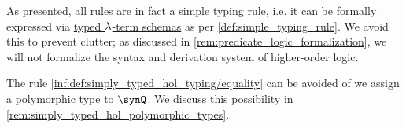 \begin{comments}
  \item As presented, all rules are in fact a simple typing rule, i.e. it can be formally expressed via \hyperref[def:lambda_term_schema]{typed \( {\mathrm \lambda} \)-term schemas} as per \cref{def:simple_typing_rule}. We avoid this to prevent clutter; as discussed in \cref{rem:predicate_logic_formalization}, we will not formalize the syntax and derivation system of higher-order logic.

  \item The rule \ref{inf:def:simply_typed_hol_typing/equality} can be avoided of we assign a \hyperref[def:polymorphic_typed_lambda_calculus]{polymorphic type} to \( \synQ \). We discuss this possibility in \cref{rem:simply_typed_hol_polymorphic_types}.
\end{comments}

